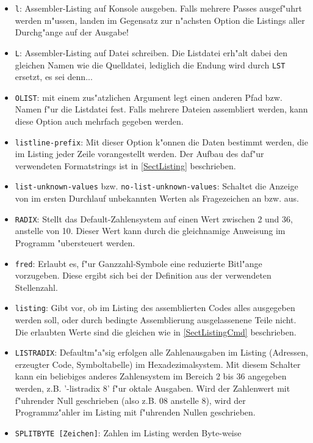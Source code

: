\documentclass[12pt,a4paper,twoside]{report}
\newcommand{\tty}[1]{{\tt #1}}
\begin{document}
\begin{itemize}
\item{\tty{l}: Assembler-Listing auf Konsole ausgeben.  Falls mehrere
      Passes ausgef"uhrt werden m"ussen, landen im Gegensatz zur
      n"achsten Option die Listings aller Durchg"ange auf der Ausgabe!}
\item{\tty{L}: Assembler-Listing auf Datei schreiben.  Die Listdatei erh"alt
      dabei den gleichen Namen wie die Quelldatei, lediglich die Endung
      wird durch \tty{LST} ersetzt, es sei denn...}
\item{\tty{OLIST}: mit einem zus"atzlichen Argument legt einen anderen
      Pfad bzw. Namen f"ur die Listdatei fest.  Falls mehrere Dateien
      assembliert werden, kann diese Option auch mehrfach gegeben werden.}
\item{\tty{listline-prefix}: Mit dieser Option k"onnen die Daten
      bestimmt werden, die im Listing jeder Zeile vorangestellt
      werden.  Der Aufbau des daf"ur verwendeten Formatstrings ist in
      \ref{SectListing} beschrieben.}
\item{{\tt list-unknown-values} bzw. {\tt no-list-unknown-values}: Schaltet
      die Anzeige von im ersten Durchlauf unbekannten Werten als Fragezeichen
      an bzw. aus.}
\item{\label{radix}\tty{RADIX}: Stellt das Default-Zahlensystem auf
      einen Wert zwischen 2 und 36, anstelle von 10.  Dieser Wert kann
      durch die gleichnamige Anweisung im Programm "ubersteuert werden.}
\item{\tty{fred}: Erlaubt es, f"ur Ganzzahl-Symbole eine reduzierte Bitl"ange
      vorzugeben.  Diese ergibt sich bei der Definition aus der verwendeten
      Stellenzahl.}
\item{\tty{listing}: Gibt vor, ob im Listing des assemblierten Codes alles
      ausgegeben werden soll, oder durch bedingte Assemblierung ausgelassenene
      Teile nicht.  Die erlaubten Werte sind die gleichen wie in \ref{SectListingCmd}
      beschrieben.}
\item{\label{listradix}\tty{LISTRADIX}: Defaultm"a"sig erfolgen alle Zahlenausgaben im Listing
      (Adressen, erzeugter Code, Symboltabelle) im Hexadezimalsystem.  Mit
      diesem Schalter kann ein beliebiges anderes Zahlensystem im Bereich
      2 bis 36 angegeben werden, z.B. '-listradix 8' f"ur oktale Ausgaben.
      Wird der Zahlenwert mit f"uhrender Null geschrieben (also z.B. 08
      anstelle 8), wird der Programmz"ahler im Listing mit f"uhrenden
      Nullen geschrieben.}
\item{\tty{SPLITBYTE [Zeichen]}: Zahlen im Listing werden Byte-weise
}
\end{itemize}
\end{document}
